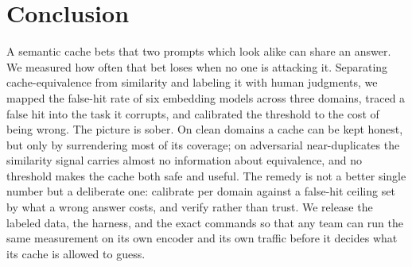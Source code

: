 \section{Conclusion}
\label{sec:conclusion}

A semantic cache bets that two prompts which look alike can share an answer. We measured how
often that bet loses when no one is attacking it. Separating cache-equivalence from
similarity and labeling it with human judgments, we mapped the false-hit rate of six
embedding models across three domains, traced a false hit into the task it corrupts, and
calibrated the threshold to the cost of being wrong. The picture is sober. On clean domains
a cache can be kept honest, but only by surrendering most of its coverage; on adversarial
near-duplicates the similarity signal carries almost no information about equivalence, and no
threshold makes the cache both safe and useful. The remedy is not a better single number but
a deliberate one: calibrate per domain against a false-hit ceiling set by what a wrong answer
costs, and verify rather than trust. We release the labeled data, the harness, and the exact
commands so that any team can run the same measurement on its own encoder and its own
traffic before it decides what its cache is allowed to guess.
